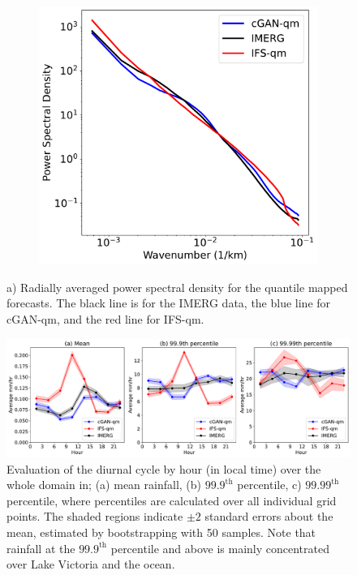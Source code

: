 \documentclass{article}
\begin{document}
\begin{figure}[!ht]
     \centering
     \begin{subfigure}{0.48\textwidth}
     \includegraphics[width=\textwidth]{images/rapsd_final-nologs_217600.pdf}
     \caption{}
     \end{subfigure}
     
     \caption{a) Radially averaged power spectral density for the quantile mapped forecasts. The black line is for the IMERG data, the blue line for cGAN-qm, and the red line for IFS-qm. 
}
     \label{fig:rapsd}
\end{figure}











\begin{figure}[t]
    \includegraphics[width=\textwidth]{images/diurnal_cycle_final-nologs_217600.pdf}
    \centering
     \caption{Evaluation of the diurnal cycle by hour (in local time) over the whole domain in; (a) mean rainfall, (b) $99.9^{\text{th}}$ percentile, c) $99.99^{\text{th}}$ percentile, where percentiles are calculated over all individual grid points. The shaded regions indicate $\pm2$ standard errors about the mean, estimated by bootstrapping with 50 samples. Note that rainfall at the $99.9^{\text{th}}$ percentile and above is mainly concentrated over Lake Victoria and the ocean.}
     \label{fig:diurnal}
\end{figure}
\end{document}
